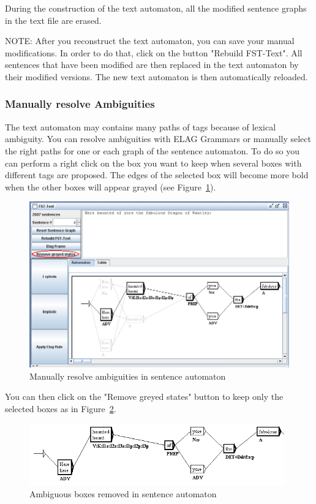 \bigskip
\noindent During the construction of the text automaton, all the modified
sentence graphs in the text file are erased.

\bigskip
\noindent NOTE: After you reconstruct the text automaton, you can save your
manual modifications. In order to do that, click on the button "Rebuild
FST-Text". All sentences that have been modified are then replaced in the text
automaton by their modified versions. The new text automaton is then
automatically reloaded.

\subsubsection{Manually resolve Ambiguities}
The text automaton may contains many paths of tags because of lexical ambiguity. You can resolve ambiguities with ELAG Grammars or manually select the right paths for one or each graph of the sentence automaton.
To do so you can perform a right click on the box you want to keep when several boxes with different tags are proposed. The edges of the selected box will become more bold when the other boxes will appear grayed (see Figure~\ref{fig-manually-resolve-ambiguities}).

\begin{figure}[!ht]
\begin{center}
\includegraphics[width=15cm]{resources/img/fig7-24b.png}
\caption{Manually resolve ambiguities in sentence automaton\label{fig-manually-resolve-ambiguities}}
\end{center}
\end{figure} 

\bigskip
\noindent You can then click on the "Remove greyed states" button to keep only the selected boxes as in Figure~\ref{fig-removed-ambiguities}.
\begin{figure}[!ht]
\begin{center}
\includegraphics[width=11cm]{resources/img/fig7-24c.png}
\caption{Ambiguous boxes removed in sentence automaton\label{fig-removed-ambiguities}}
\end{center}
\end{figure}


